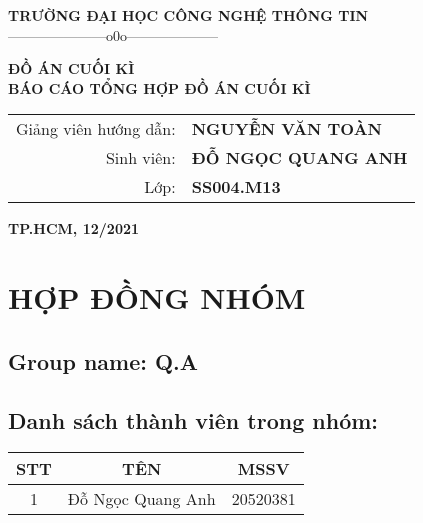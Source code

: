 \documentclass[a4paper,14pt]{extreport}
\begin{document}
\fontsize{13pt}{18pt}\selectfont

\setlength{\baselineskip}{18truept}

\begin{titlepage} 

\begin{center}

{\large\bf TRƯỜNG ĐẠI HỌC CÔNG NGHỆ THÔNG TIN}\\


{———————o0o——————–}

\vskip 4cm

{\bf ĐỒ ÁN CUỐI KÌ}\\[1cm]

{\Large\bf \textbf{BÁO CÁO TỔNG HỢP ĐỒ ÁN CUỐI KÌ }}\\

\vskip 1cm



\vskip 5cm

\begin{tabular}{r l}

Giảng viên hướng dẫn:&{\bf NGUYỄN VĂN TOÀN}\\[0.5cm]

Sinh viên:&{\bf ĐỖ NGỌC QUANG ANH}\\[0.5cm]

Lớp:&{\bf SS004.M13}

\end{tabular}

\vfill

{\bf TP.HCM, 12/2021}

\end{center}

\end{titlepage}




\tableofcontents %

\chapter{HỢP ĐỒNG NHÓM} %


\section{Group name: Q.A}
\section{Danh sách thành viên trong nhóm:}
\begin{tabular}{|c|c|c|}
\hline
STT& TÊN & MSSV\\

\hline
1& Đỗ Ngọc Quang Anh& 20520381\\
\hline
\end{tabular}
\end{document}
